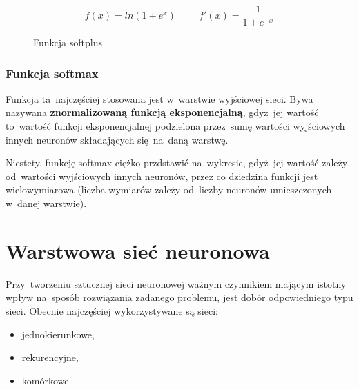 \begin{minipage}[t]{\textwidth}
\begin{equation}
	f(x) = ln(1 + e^x)  \hspace{1cm} f'(x) = \frac{1}{1 + e^{-x}}
\end{equation}
\begin{figure}[H]
    \centering
    \caption{Funkcja softplus}
\end{figure}
\end{minipage}

\subsubsection{Funkcja softmax}
Funkcja ta~najczęściej stosowana jest w~warstwie wyjściowej sieci. Bywa nazywana \textbf{znormalizowaną funkcją
eksponencjalną}, gdyż~jej wartość to~wartość funkcji eksponencjalnej podzielona przez~sumę wartości wyjściowych innych
neuronów składających się~na~daną warstwę.

Niestety, funkcję softmax ciężko przdstawić na~wykresie, gdyż~jej wartość zależy od~wartości wyjściowych
innych neuronów, przez co dziedzina funkcji jest wielowymiarowa (liczba wymiarów zależy od~liczby neuronów
umieszczonych w~danej warstwie).

\section{Warstwowa sieć neuronowa}
Przy~tworzeniu sztucznej sieci neuronowej ważnym czynnikiem mającym istotny wpływ na~sposób rozwiązania
zadanego problemu, jest dobór odpowiedniego typu sieci. Obecnie najczęściej wykorzystywane są sieci:
\begin{itemize}
  \item jednokierunkowe,
  \item rekurencyjne,
  \item komórkowe.
\end{itemize}

